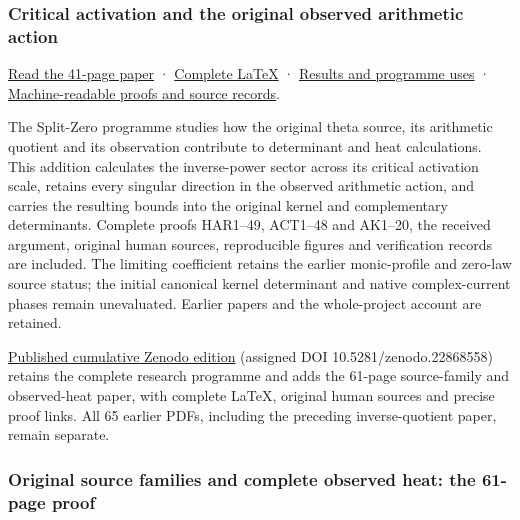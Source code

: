 \documentclass[
]{article}
\begin{document}
\subsubsection{Critical activation and the original observed arithmetic
action}\label{critical-activation-and-the-original-observed-arithmetic-action}

\href{https://github.com/KokunoYumeto/zeta-function-research-reader/blob/main/workbenches/splitzero-tandem/continuations/20260921-critical-inverse-activation/CRITICAL_ACTIVATION_COMPLETE_READER.pdf}{Read
the 41-page paper} ·
\href{https://github.com/KokunoYumeto/zeta-function-research-reader/blob/main/workbenches/splitzero-tandem/continuations/20260921-critical-inverse-activation/CRITICAL_ACTIVATION_COMPLETE_READER.tex}{Complete
LaTeX} ·
\href{https://github.com/KokunoYumeto/zeta-function-research-reader/blob/main/workbenches/splitzero-tandem/continuations/20260921-critical-inverse-activation/RESULTS_20260921_015.md}{Results
and programme uses} ·
\href{https://github.com/KokunoYumeto/zeta-function-research-reader/blob/main/workbenches/splitzero-tandem/continuations/20260921-critical-inverse-activation/RESULT_INDEX.json}{Machine-readable
proofs and source records}.

The Split-Zero programme studies how the original theta source, its
arithmetic quotient and its observation contribute to determinant and
heat calculations. This addition calculates the inverse-power sector
across its critical activation scale, retains every singular direction
in the observed arithmetic action, and carries the resulting bounds into
the original kernel and complementary determinants. Complete proofs
HAR1--49, ACT1--48 and AK1--20, the received argument, original human
sources, reproducible figures and verification records are included. The
limiting coefficient retains the earlier monic-profile and zero-law
source status; the initial canonical kernel determinant and native
complex-current phases remain unevaluated. Earlier papers and the
whole-project account are retained.

\href{https://zenodo.org/records/22868558}{Published cumulative Zenodo
edition} (assigned DOI 10.5281/zenodo.22868558) retains the complete
research programme and adds the 61-page source-family and observed-heat
paper, with complete LaTeX, original human sources and precise proof
links. All 65 earlier PDFs, including the preceding inverse-quotient
paper, remain separate.

\subsubsection{Original source families and complete observed heat: the
61-page
proof}\label{original-source-families-and-complete-observed-heat-the-61-page-proof}
\end{document}
